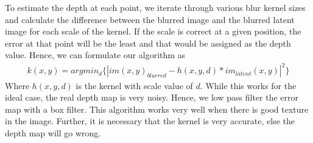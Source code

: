 \documentclass[BTech]{iitmdiss}
\begin{document}
To estimate the depth at each point, we iterate through various blur
kernel sizes and calculate the difference between the blurred image and
the blurred latent image for each scale of the kernel. If the scale is
correct at a given position, the error at that point will be the least
and that would be assigned as the depth value. Hence, we can formulate
our algorithm as
\begin{align}
k(x,y) = argmin_d\{|im(x,y)_{blurred}-h(x,y,d)*im_{latent}(x,y)|^2\}
\end{align}
Where $h(x,y,d)$ is the kernel with scale value of $d$. While this works
for the ideal case, the real depth map is very noisy. Hence, we low pass
filter the error map with a box filter. This algorithm works very well
when there is good texture in the image. Further, it is necessary that
the kernel is very accurate, else the depth map will go wrong. 
\end{document}
